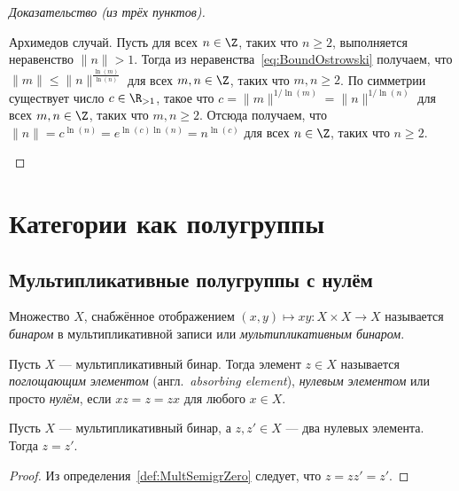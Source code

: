 \documentclass[
	extrafontsizes,
	11pt,
	hyphens,
]{memoir}
\begin{document}
\begin{proof}[Доказательство (из трёх пунктов)]
\begin{proofdescription}
\item[Архимедов случай.]
Пусть для всех \(n \in \Z\), таких что \(n \geq 2\), выполняется неравенство \(\lVert n \rVert > 1\).
Тогда из неравенства~\eqref{eq:BoundOstrowski} получаем, что \(\lVert m \rVert \leq \lVert n \rVert^{\frac{\ln(m)}{\ln(n)}}\) для всех \(m,n \in \Z\), таких что \(m,n \geq 2\).
По симметрии существует число \(c \in \R_{> 1}\), такое что \(c = \lVert m \rVert^{1/\ln(m)} = \lVert n \rVert^{1/\ln(n)}\) для всех \(m,n \in \Z\), таких что \(m,n \geq 2\).
Отсюда получаем, что
\(\lVert n \rVert = c^{\ln(n)} = e^{\ln(c) \ln(n)} = n^{\ln(c)}\)
для всех \(n \in \Z\), таких что \(n \geq 2\).
\qedhere
\end{proofdescription}
\end{proof}


\section{Категории как полугруппы}

\subsection{Мультипликативные полугруппы с нулём}

\begin{definition}
Множество \(X\), снабжённое отображением \((x,y) \mapsto xy : X \times X \to X\) называется \emph{бинаром} в мультипликативной записи или \emph{мультипликативным бинаром}.
\end{definition}

\begin{definition}
Пусть \(X\) --- мультипликативный бинар.
\label{def:MultSemigrZero}
Тогда элемент \(z \in X\) называется \emph{поглощающим элементом} (англ.\ \emph{\textenglish{absorbing element}}), \emph{нулевым элементом} или просто \emph{нулём}, если \(xz = z = zx\) для любого \(x \in X\).
\end{definition}

\begin{theorem}
Пусть \(X\) --- мультипликативный бинар, а \(z, z' \in X\) --- два нулевых элемента. Тогда \(z = z'\).
\end{theorem}

\begin{proof}
Из определения~\ref{def:MultSemigrZero} следует, что \(z = zz' = z'\).
\end{proof}
\end{document}
